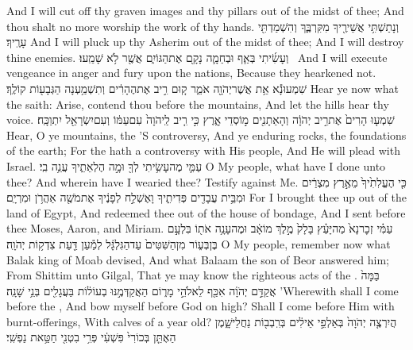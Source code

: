 {And I will cut off thy graven images and thy pillars out of the midst of thee; And thou shalt no more worship the work of thy hands.}
{וְנָתַשְׁתִּ֥י אֲשֵׁירֶ֖יךָ מִקִּרְבֶּ֑ךָ וְהִשְׁמַדְתִּ֖י עָרֶֽיךָ׃}
{And I will pluck up thy Asherim out of the midst of thee; And I will destroy thine enemies.}
{וְעָשִׂ֜יתִי בְּאַ֧ף וּבְחֵמָ֛ה נָקָ֖ם אֶת\maqqaf הַגּוֹיִ֑ם אֲשֶׁ֖ר לֹ֥א שָׁמֵֽעוּ׃ \petucha }
{And I will execute vengeance in anger and fury upon the nations, Because they hearkened not.}
\newperek
{}
{שִׁמְעוּ\maqqaf נָ֕א אֵ֥ת אֲשֶׁר\maqqaf יְהֹוָ֖ה אֹמֵ֑ר ק֚וּם רִ֣יב אֶת\maqqaf הֶהָרִ֔ים וְתִשְׁמַ֥עְנָה הַגְּבָע֖וֹת קוֹלֶֽךָ׃}
{Hear ye now what the \lord\space saith: Arise, contend thou before the mountains, And let the hills hear thy voice.}
{שִׁמְע֤וּ הָרִים֙ אֶת\maqqaf רִ֣יב יְהֹוָ֔ה וְהָאֵתָנִ֖ים מ֣וֹסְדֵי אָ֑רֶץ כִּ֣י רִ֤יב לַֽיהֹוָה֙ עִם\maqqaf עַמּ֔וֹ וְעִם\maqqaf יִשְׂרָאֵ֖ל יִתְוַכָּֽח׃}
{Hear, O ye mountains, the \lord’S controversy, And ye enduring rocks, the foundations of the earth; For the \lord\space hath a controversy with His people, And He will plead with Israel.}
{עַמִּ֛י מֶה\maqqaf עָשִׂ֥יתִי לְךָ֖ וּמָ֣ה הֶלְאֵתִ֑יךָ עֲנֵ֥ה בִֽי׃}
{O My people, what have I done unto thee? And wherein have I wearied thee? Testify against Me.}
{כִּ֤י הֶעֱלִתִ֙יךָ֙ מֵאֶ֣רֶץ מִצְרַ֔יִם וּמִבֵּ֥ית עֲבָדִ֖ים פְּדִיתִ֑יךָ וָאֶשְׁלַ֣ח לְפָנֶ֔יךָ אֶת\maqqaf מֹשֶׁ֖ה אַהֲרֹ֥ן וּמִרְיָֽם׃}
{For I brought thee up out of the land of Egypt, And redeemed thee out of the house of bondage, And I sent before thee Moses, Aaron, and Miriam.}
{עַמִּ֗י זְכׇר\maqqaf נָא֙ מַה\maqqaf יָּעַ֗ץ בָּלָק֙ מֶ֣לֶךְ מוֹאָ֔ב וּמֶה\maqqaf עָנָ֥ה אֹת֖וֹ בִּלְעָ֣ם בֶּן\maqqaf בְּע֑וֹר מִן\maqqaf הַשִּׁטִּים֙ עַד\maqqaf הַגִּלְגָּ֔ל לְמַ֕עַן דַּ֖עַת צִדְק֥וֹת יְהֹוָֽה׃}
{O My people, remember now what Balak king of Moab devised, And what Balaam the son of Beor answered him; From Shittim unto Gilgal, That ye may know the righteous acts of the \lord.}
{בַּמָּה֙ אֲקַדֵּ֣ם יְהֹוָ֔ה אִכַּ֖ף לֵאלֹהֵ֣י מָר֑וֹם הַאֲקַדְּמֶ֣נּוּ בְעוֹל֔וֹת בַּעֲגָלִ֖ים בְּנֵ֥י שָׁנָֽה׃}
{’Wherewith shall I come before the \lord, And bow myself before God on high? Shall I come before Him with burnt-offerings, With calves of a year old?}
{הֲיִרְצֶ֤ה יְהֹוָה֙ בְּאַלְפֵ֣י אֵילִ֔ים בְּרִֽבְב֖וֹת נַחֲלֵי\maqqaf שָׁ֑מֶן הַאֶתֵּ֤ן בְּכוֹרִי֙ פִּשְׁעִ֔י פְּרִ֥י בִטְנִ֖י חַטַּ֥את נַפְשִֽׁי׃}
